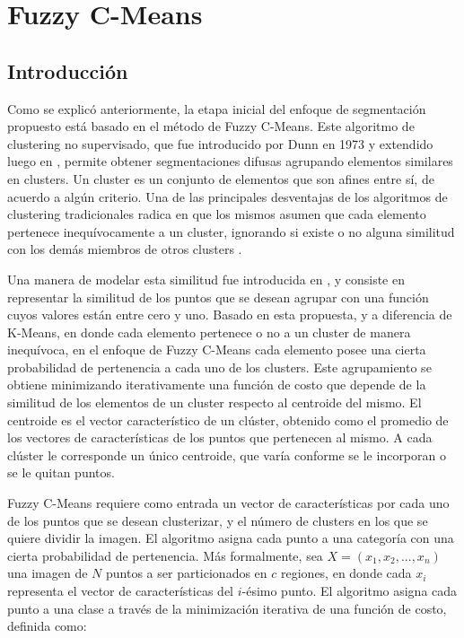 \chapter{Fuzzy C-Means}\label{chap:fuzzy}
\section{Introducción}
\label{Introduccion}

Como se explicó anteriormente, la etapa inicial del enfoque de segmentación propuesto está basado en el método de Fuzzy C-Means. Este algoritmo de clustering no supervisado, que fue introducido por Dunn en 1973 \citep{dunn1973fuzzy} y extendido luego en \citep{bezdek1984fcm}, permite obtener segmentaciones difusas agrupando elementos similares en clusters. Un cluster es un conjunto de elementos que son afines entre sí, de acuerdo a algún criterio. Una de las principales desventajas de los algoritmos de clustering tradicionales radica en que los mismos asumen que cada elemento pertenece inequívocamente a un cluster, ignorando si existe o no alguna similitud con los demás miembros de otros clusters \citep{full1982fuzzy}.
 
Una manera de modelar esta similitud fue introducida en \citep{zadeh1965fuzzy}, y consiste en representar la similitud de los puntos que se desean agrupar con una función cuyos valores están entre cero y uno. Basado en esta propuesta, y a diferencia de K-Means, en donde cada elemento pertenece o no a un cluster de manera inequívoca, en el enfoque de Fuzzy C-Means cada elemento posee una cierta probabilidad de pertenencia a cada uno de los clusters. Este agrupamiento se obtiene minimizando iterativamente una función de costo que depende de la similitud de los elementos de un cluster respecto al centroide del mismo. El centroide es el vector característico de un clúster, obtenido como el promedio de los vectores de características de los puntos que pertenecen al mismo. A cada clúster le corresponde un único centroide, que varía conforme se le incorporan o se le quitan puntos.

Fuzzy C-Means requiere como entrada un vector de características por cada uno de los puntos que se desean clusterizar, y el número de clusters en los que se quiere dividir la imagen. El algoritmo asigna cada punto a una categoría con una cierta probabilidad de pertenencia. Más formalmente, sea $ X = (x_1, x_2, ..., x_n)$ una imagen de $N$ puntos a ser particionados en $c$ regiones, en donde cada $x_i$ representa el vector de características del $i$-ésimo punto. El algoritmo asigna cada punto a una clase a través de la minimización iterativa de una función de costo, definida como:


